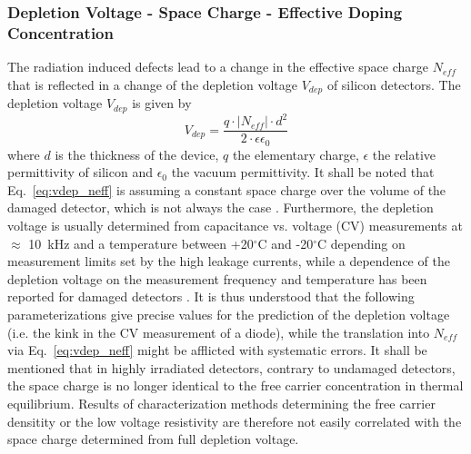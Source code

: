 \subsubsection{Depletion Voltage - Space Charge - Effective Doping Concentration}
\label{sec:space_charge}
The radiation induced defects lead to a change in the effective space charge $N_{eff}$ that is reflected in a change of the depletion voltage $V_{dep}$ of silicon detectors. The depletion voltage $V_{dep}$ is given by
\begin{equation}
\label{eq:vdep_neff} 
V_{dep}= \frac{q\cdot\left|N_{eff}\right|\cdot d^2}{2 \cdot \epsilon\epsilon_0}
\end{equation}
where $d$ is the thickness of the device, $q$ the elementary charge, $\epsilon$ the relative permittivity of silicon and $\epsilon_0$ the vacuum permittivity. 
It shall be noted that Eq.~\ref{eq:vdep_neff} is assuming a constant space charge over the volume of the damaged detector, which is not always the case \cite{2002-Eremin-doublejunction}. Furthermore, the depletion voltage is usually determined from capacitance vs. voltage (CV) measurements at $\approx$ 10~kHz and a temperature between +20$^\circ$C and -20$^\circ$C depending on measurement limits set by the high leakage currents, while a dependence of the depletion voltage on the measurement frequency and temperature has been reported for damaged detectors \cite{2002-Campbell-vdep-ft}. It is thus understood that the following parameterizations give precise values for the prediction of the depletion voltage (i.e. the kink in the CV measurement of a diode), while the translation into $N_{eff}$ via Eq.~\ref{eq:vdep_neff} might be afflicted with systematic errors. 
It shall be mentioned that in highly irradiated detectors, contrary to undamaged detectors, the space charge is no longer identical to the free carrier concentration in thermal equilibrium. Results of characterization methods determining the free carrier densitity or the low voltage resistivity are therefore not easily correlated with the space charge determined from full depletion voltage.
